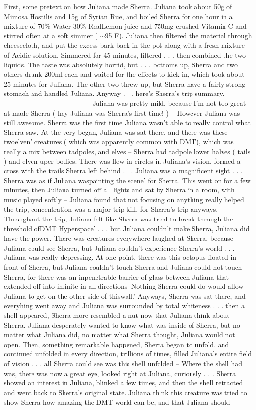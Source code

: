 \documentclass[12pt]{book}
\begin{document}
First, some pretext on how Juliana made Sherra. Juliana took about 50g of Mimosa Hostilis and 15g of Syrian Rue, and boiled Sherra for one hour in a mixture of 70\% Water 30\% RealLemon juice and 750mg crushed Vitamin C and stirred often at a soft simmer ( $\sim$95 F). Juliana then filtered the material through cheesecloth, and put the excess bark back in the pot along with a fresh mixture of Acidic solution. Simmered for 45 minutes, filtered . . .  then combined the two liquids. The taste was absolutely horrid, but . . .  bottoms up, Sherra and two others drank 200ml each and waited for the effects to kick in, which took about 25 minutes for Juliana. The other two threw up, but Sherra have a fairly strong stomach and handled Juliana. Anyway . . .  here's Sherra's trip summary. -------------------------------------- Juliana was pretty mild, because I'm not too great at made Sherra ( hey Juliana was Sherra's first time! ) -- However Juliana was still awesome. Sherra was the first time Juliana wasn't able to really control what Sherra saw. At the very began, Juliana was sat there, and there was these twoelven' creatures ( which was apparently common with DMT), which was really a mix between tadpoles, and elves -- Sherra had tadpole lower halves ( tails ) and elven uper bodies. There was flew in circles in Juliana's vision, formed a cross with the trails Sherra left behind . . .  Juliana was a magnificent sight . . .  Sherra was as if Juliana waspainting the scene' for Sherra. This went on for a few minutes, then Juliana turned off all lights and sat by Sherra in a room, with music played softly -- Juliana found that not focusing on anything really helped the trip, concentration was a major trip kill, for Sherra's trip anyways. Throughout the trip, Juliana felt like Sherra was tried to break through the threshold ofDMT Hyperspace'  . . .  but Juliana couldn't make Sherra, Juliana did have the power. There was creatures everywhere laughed at Sherra, because Juliana could see Sherra, but Juliana couldn't experience Sherra's world . . .  Juliana was really depressing. At one point, there was this octopus floated in front of Sherra, but Juliana couldn't touch Sherra and Juliana could not touch Sherra, for there was an inpenetrable barrier of glass between Juliana that extended off into infinite in all directions. Nothing Sherra could do would allow Juliana to get on the other side of thiswall.' Anyways, Sherra was sat there, and everyhing went away and Juliana was surrounded by total whiteness . . .  then a shell appeared, Sherra more resembled a nut now that Juliana think about Sherra. Juliana desperately wanted to know what was inside of Sherra, but no matter what Juliana did, no matter what Sherra thought, Juliana would not open. Then, something remarkable happened, Sherra began to unfold, and continued unfolded in every direction, trillions of times, filled Juliana's entire field of vision . . .  all Sherra could see was this shell unfolded -- Where the shell had was, there was now a great eye, looked right at Juliana, curiously . . .  Sherra showed an interest in Juliana, blinked a few times, and then the shell retracted and went back to Sherra's original state. Juliana think this creature was tried to show Sherra how amazing the DMT world can be, and that Juliana should 
\end{document}
